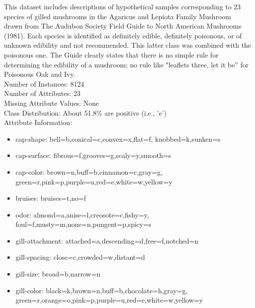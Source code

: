 \documentclass[12t]{article}
\begin{document}
\begin{itemize}
	This dataset includes descriptions of hypothetical samples corresponding to 23 species of gilled mushrooms in the Agaricus and Lepiota Family Mushroom drawn from The Audubon Society Field Guide to North American Mushrooms (1981). Each species is identified as definitely edible, definitely poisonous, or of unknown edibility and not recommended. This latter class was combined with the poisonous one. The Guide clearly states that there is no simple rule for determining the edibility of a mushroom; no rule like "leaflets three, let it be'' for Poisonous Oak and Ivy. \\
	
	Number of Instances: 8124 \\
	
	Number of Attributes: 23 \\
	
	Missing Attribute Values: None \\
	
	Class Distribution: About 51.8\% are positive (i.e., 'e') \\
	
	Attribute Information:
	\begin{itemize}
		\item cap-shape: bell=b,conical=c,convex=x,flat=f, knobbed=k,sunken=s
		
		\item cap-surface: fibrous=f,grooves=g,scaly=y,smooth=s
		
		\item cap-color: brown=n,buff=b,cinnamon=c,gray=g,\\ green=r,pink=p,purple=u,red=e,white=w,yellow=y
		
		\item bruises: bruises=t,no=f
		
		\item odor: almond=a,anise=l,creosote=c,fishy=y,\\ foul=f,musty=m,none=n,pungent=p,spicy=s
		
		\item gill-attachment: attached=a,descending=d,free=f,notched=n
		
		\item gill-spacing: close=c,crowded=w,distant=d
		
		\item gill-size: broad=b,narrow=n
		
		\item gill-color: black=k,brown=n,buff=b,chocolate=h,gray=g, \\ green=r,orange=o,pink=p,purple=u,red=e,white=w,yellow=y
		

\end{itemize}
\end{itemize}
\end{document}
